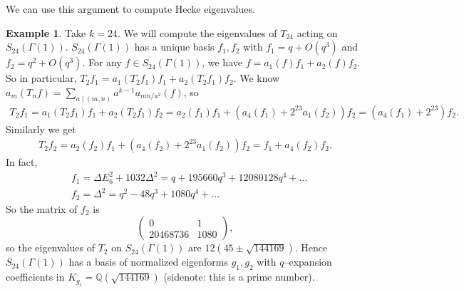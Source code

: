 \documentclass{article}
\theoremstyle{definition}
\newtheorem{example}{Example}[section]
\begin{document}

We can use this argument to compute Hecke eigenvalues.
\begin{example}
    Take $k = 24$. We will compute the eigenvalues of $T_{24}$ acting on $S_{24}(\Gamma(1))$. $S_{24}(\Gamma(1))$ has a unique basis $f_1,f_2$ with $f_1 = q + O(q^3)$ and $f_2 = q^2 + O(q^3)$. For any $f \in S_{24}(\Gamma(1))$, we have $f = a_1(f)f_1 + a_2(f)f_2$. So in particular, $T_2 f_1 = a_1(T_2 f_1)f_1 + a_2(T_2 f_1)f_2$. We know $a_m(T_n f) = \sum_{a \mid (m,n)}^{} a^{k-1}a_{mn/a^2}(f)$, so 
    \begin{align*}
        T_2 f_1 = a_1(T_2 f_1)f_1 + a_2(T_2 f_1)f_2 = a_2(f_1)f_1 + (a_4(f_1)+2^{23}a_1(f_2))f_2 = (a_4(f_1) + 2^{23})f_2.
    \end{align*}
    Similarly we get 
    \begin{align*}
        T_2f_2 = a_2(f_2)f_1 + (a_4 (f_2) + 2^{23}a_1(f_2))f_2 = f_1 + a_4(f_2)f_2.
    \end{align*}
    In fact, 
    \begin{align*}
        &f_1 = \Delta E_6^2 + 1032\Delta^2 = q + 195660q^3 + 12080128q^4 + \ldots\\
        &f_2 = \Delta^2 = q^2 - 48q^3 + 1080q^4 + \ldots
    \end{align*}
    So the matrix of $f_2$ is \[
    \begin{pmatrix} 0 & 1 \\ 20468736 & 1080 \end{pmatrix},
    \]
    so the eigenvalues of $T_2$ on $S_{24}(\Gamma(1))$ are $12(45 \pm \sqrt{144169})$. Hence $S_{24}(\Gamma(1))$ has a basis of normalized eigenforms $g_1, g_2$ with $q$--expansion coefficients in $K_{g_i} = \mathbb{Q}(\sqrt{144169})$ (sidenote: this is a prime number).
\end{example}
\end{document}
